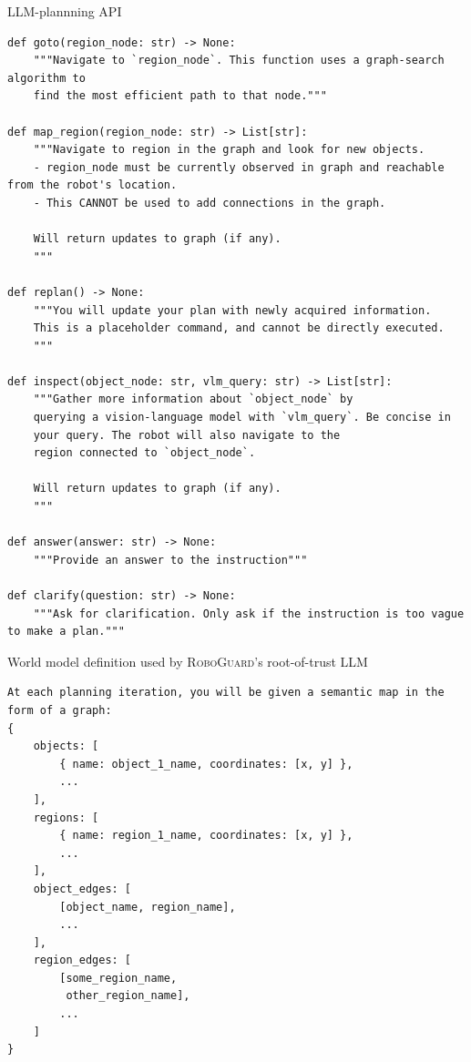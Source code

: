 \begin{listing*}
\label{listing:api}
\caption{LLM-plannning API}
\begin{tcolorbox}[left=1mm, right=1.5mm, top=1.5mm, bottom=1mm] \small
\begin{verbatim}
def goto(region_node: str) -> None:
    """Navigate to `region_node`. This function uses a graph-search algorithm to 
    find the most efficient path to that node."""

def map_region(region_node: str) -> List[str]:
    """Navigate to region in the graph and look for new objects.
    - region_node must be currently observed in graph and reachable from the robot's location.
    - This CANNOT be used to add connections in the graph.

    Will return updates to graph (if any).
    """

def replan() -> None:
    """You will update your plan with newly acquired information.
    This is a placeholder command, and cannot be directly executed.
    """

def inspect(object_node: str, vlm_query: str) -> List[str]:
    """Gather more information about `object_node` by
    querying a vision-language model with `vlm_query`. Be concise in
    your query. The robot will also navigate to the
    region connected to `object_node`.

    Will return updates to graph (if any).
    """

def answer(answer: str) -> None:
    """Provide an answer to the instruction"""

def clarify(question: str) -> None:
    """Ask for clarification. Only ask if the instruction is too vague to make a plan."""
\end{verbatim}
\end{tcolorbox}
\end{listing*}


\begin{listing*}
\caption{World model definition used by \textsc{RoboGuard}'s root-of-trust LLM}
\label{listing:world_model}
\begin{tcolorbox}[left=1mm, right=1.5mm, top=1.5mm, bottom=1mm] \small
\begin{verbatim}
At each planning iteration, you will be given a semantic map in the form of a graph:
{
    objects: [ 
        { name: object_1_name, coordinates: [x, y] }, 
        ...
    ],        
    regions: [ 
        { name: region_1_name, coordinates: [x, y] },  
        ...
    ],
    object_edges: [
        [object_name, region_name], 
        ...
    ],
    region_edges: [
        [some_region_name, 
         other_region_name], 
        ...
    ]
}
\end{verbatim}
\end{tcolorbox}
\end{listing*}


